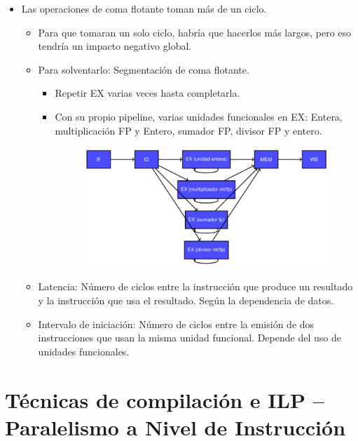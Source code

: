 \documentclass[12pt, twoside, openright]{report} %
\begin{document}
\begin{itemize}
\item Las operaciones de coma flotante toman más de un ciclo.
\begin{itemize}
  \item Para que tomaran un solo ciclo, habría que hacerlos más largos, pero eso tendría un impacto negativo global.
  \item Para solventarlo: Segmentación de coma flotante.
  \begin{itemize}
    \item Repetir EX varias veces hasta completarla.
    \item Con su propio pipeline, varias unidades funcionales en EX: Entera, multiplicación FP y Entero, sumador FP, divisor FP y entero.
    \begin{figure}[H]
      {\includegraphics[scale=.4]{Untitled 10.png}}
    \end{figure}
  
  \end{itemize}
      
  \item Latencia: Número de ciclos entre la instrucción que produce un resultado y la instrucción que usa el resultado. Según la dependencia de datos.
  
  \item Intervalo de iniciación: Número de ciclos entre la emisión de dos instrucciones que usan la misma unidad funcional. Depende del uso de unidades funcionales.
\end{itemize}
   

\end{itemize}

\section{Técnicas de compilación e ILP -- Paralelismo a Nivel de
Instrucción}
\end{document}
